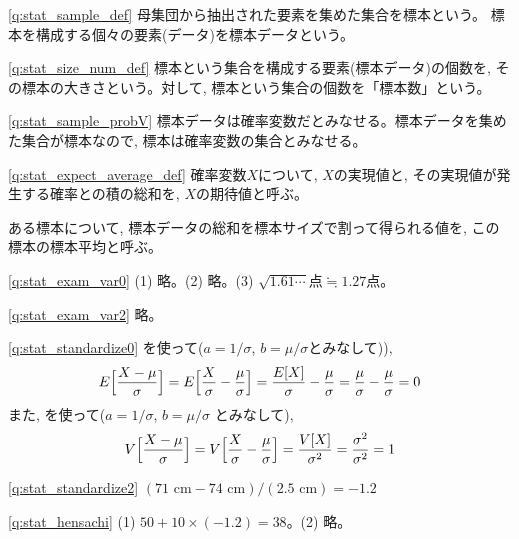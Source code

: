 \ref{q:stat_sample_def} 
母集団から抽出された要素を集めた集合を標本という。
標本を構成する個々の要素(データ)を標本データという。
\mv

\ref{q:stat_size_num_def}
標本という集合を構成する要素(標本データ)の個数を, 
その標本の大きさという。対して, 標本という集合の個数を「標本数」という。
\mv

\ref{q:stat_sample_probV} 
標本データは確率変数だとみなせる。標本データを集めた集合が標本なので, 標本は確率変数の集合とみなせる。
\mv

\ref{q:stat_expect_average_def}
確率変数$X$について, $X$の実現値と, その実現値が発生する確率との積の総和を, $X$の期待値と呼ぶ。

ある標本について, 標本データの総和を標本サイズで割って得られる値を, この標本の標本平均と呼ぶ。
\mv

\ref{q:stat_exam_var0}  (1) 略。(2) 略。(3) $\sqrt{1.61\cdots}\text{点}\fallingdotseq 1.27$点。
\mv

\ref{q:stat_exam_var2}  略。
\mv

\ref{q:stat_standardize0} 
を使って($a=1/\sigma$, $b=\mu/\sigma$とみなして)), 
\begin{eqnarray*}
E\Bigl[\frac{X-\mu}{\sigma}\Bigr]=E\Bigl[\frac{X}{\sigma}-\frac{\mu}{\sigma}\Bigr]
=\frac{E[X]}{\sigma}-\frac{\mu}{\sigma}=\frac{\mu}{\sigma}-\frac{\mu}{\sigma}=0
\end{eqnarray*}
また, を使って($a=1/\sigma$, $b=\mu/\sigma$
とみなして),
\begin{eqnarray*}
V\Bigl[\frac{X-\mu}{\sigma}\Bigr]=V\Bigl[\frac{X}{\sigma}-\frac{\mu}{\sigma}\Bigr]
=\frac{V[X]}{\sigma^2}=\frac{\sigma^2}{\sigma^2}=1
\end{eqnarray*}

\ref{q:stat_standardize2}  $(71\text{ cm}-74\text{ cm})/(2.5\text{ cm})=-1.2$
\mv

% 
\ref{q:stat_hensachi} (1) $50+10\times(-1.2)= 38$。(2) 略。
\mv

